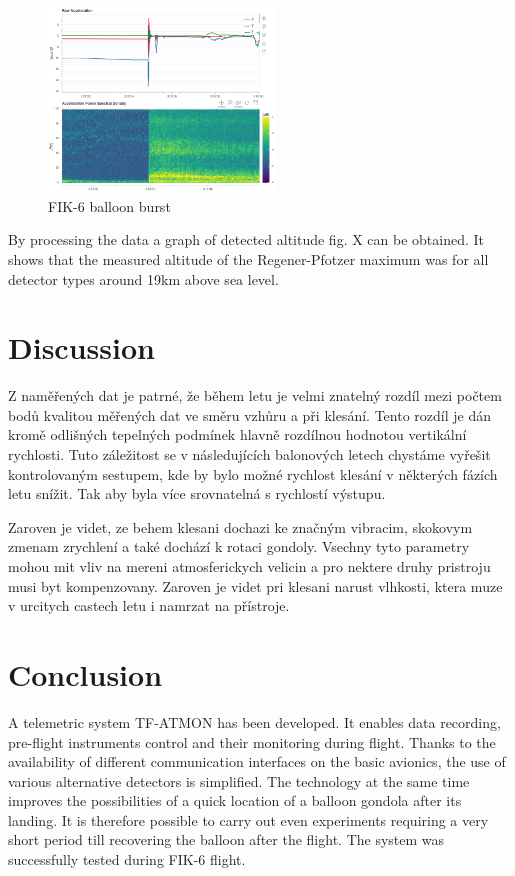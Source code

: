 \documentclass{Rpd}
\begin{document}
\begin{center}
\begin{figure}%
	\centerline{\includegraphics[width=60mm]{img/FIK-6_balloon_burst.png}}
	\caption{FIK-6 balloon burst \label{FIK-6_balloon_burst}}
\end{figure}
\end{center}

By processing the data a graph of detected altitude fig. X can be obtained. It shows that the measured altitude of the Regener-Pfotzer maximum was for all detector types around 19km above sea level.

\section{Discussion}


Z naměřených dat je patrné, že během letu je velmi znatelný rozdíl mezi počtem bodů kvalitou měřených dat ve směru vzhůru a při klesání. Tento rozdíl je dán kromě odlišných tepelných podmínek hlavně rozdílnou hodnotou vertikální rychlosti.  Tuto záležitost se v následujících balonových letech chystáme vyřešit kontrolovaným sestupem, kde by bylo možné rychlost klesání v některých fázích letu snížit. Tak aby byla více srovnatelná s rychlostí výstupu.

Zaroven je videt, ze behem klesani dochazi ke značným vibracim, skokovym zmenam zrychlení a také dochází k rotaci gondoly. Vsechny tyto parametry mohou mit vliv na mereni atmosferickych velicin a pro nektere druhy pristroju musi byt kompenzovany. Zaroven je videt pri klesani narust vlhkosti, ktera muze v urcitych castech letu i namrzat na přístroje.



\section{Conclusion}

A telemetric system TF-ATMON has been developed. It enables data recording, pre-flight instruments control and their monitoring during flight. Thanks to the availability of different communication interfaces on the basic avionics, the use of various alternative detectors is simplified. The technology at the same time improves the possibilities of a quick location of a balloon gondola after its landing. It is therefore possible to carry out even experiments requiring a very short period till recovering the balloon after the flight. The system was successfully tested during FIK-6 flight.
\end{document}
